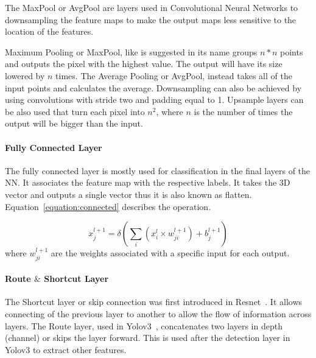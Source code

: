 \documentclass[conference]{IEEEtran}
\begin{document}
The MaxPool or AvgPool are layers used in Convolutional Neural Networks to
downsampling the feature maps to make the output maps less sensitive to the
location of the features.

Maximum Pooling or MaxPool, like is suggested in its name groups $ n * n $
points and outputs the pixel with the highest value.  The output will have its size
lowered by $n$ times.  The Average Pooling or AvgPool, instead takes all of
the input points and calculates the average. Downsampling can also be achieved
by using convolutions with stride two and padding equal to 1.  Upsample layers can
be also used that turn each pixel into $n^{2}$, where $n$ is the number of times
the output will be bigger than the input.

 

\paragraph{Fully Connected Layer}

The fully connected layer is mostly used for classification in the final layers
of the NN. It associates the feature map with the respective labels.  It takes the
3D vector and outputs a single vector thus it is also known as flatten.
Equation~\ref{equation:connected} describes the operation.

\begin{equation} \label{equation:connected}
     \displaystyle x_{j}^{l+1}=\delta (\sum_{i}(x_{i}^{l} \times w_{ji}^{l+1})+ b_{j}^{l+1})
\end{equation}
where $w_{ji}^{l+1}$ are the weights associated with a specific input for each output.


\paragraph{Route $\&$ Shortcut Layer}

The Shortcut layer or skip connection was first introduced in
Resnet~\cite{resnet}.  It allows connecting of the previous layer to another to
allow the flow of information across layers.  The Route layer, used in
Yolov3~\cite{yolov3}, concatenates two layers in depth (channel) or skips the
layer forward. This is used after the detection layer in Yolov3 to extract other
features.
\end{document}
